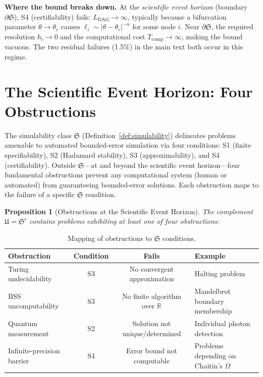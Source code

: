 \documentclass[11pt,a4paper]{article}
\newtheorem{proposition}[definition]{Proposition}
\newcommand{\R}{\mathbb{R}}
\newcommand{\Sclass}{\mathfrak{S}}
\begin{document}
\textbf{Where the bound breaks down.} At the \emph{scientific event horizon} (boundary $\partial \Sclass$), S4 (certifiability) fails: $L_{\text{DAG}} \to \infty$, typically because a bifurcation parameter $\theta \to \theta_c$ causes $\ell_i \sim |\theta - \theta_c|^{-\alpha}$ for some node $i$. Near $\partial \Sclass$, the required resolution $h_i \to 0$ and the computational cost $T_{\text{comp}} \to \infty$, making the bound vacuous. The two residual failures (1.5\%) in the main text both occur in this regime.

\section{The Scientific Event Horizon: Four Obstructions}
\label{sec:s2}

The simulability class $\Sclass$ (Definition~\ref{def:simulability}) delineates problems amenable to automated bounded-error simulation via four conditions: S1 (finite specifiability), S2 (Hadamard stability), S3 (approximability), and S4 (certifiability). Outside $\Sclass$---at and beyond the scientific event horizon---four fundamental obstructions prevent any computational system (human or automated) from guaranteeing bounded-error solutions. Each obstruction maps to the failure of a specific $\Sclass$ condition.

\begin{proposition}[Obstructions at the Scientific Event Horizon]
The complement $\mathfrak{U} = \Sclass^c$ contains problems exhibiting at least one of four obstructions:
\end{proposition}

\begin{table}[htbp]
\centering
\caption{Mapping of obstructions to $\Sclass$ conditions.}
\small
\begin{tabularx}{\textwidth}{lccX}
\toprule
\textbf{Obstruction} & \textbf{Condition} & \textbf{Fails} & \textbf{Example} \\
\midrule
Turing undecidability & S3 & No convergent approximation & Halting problem \\
BSS uncomputability & S3 & No finite algorithm over $\R$ & Mandelbrot boundary membership \\
Quantum measurement & S2 & Solution not unique/determined & Individual photon detection \\
Infinite-precision barrier & S4 & Error bound not computable & Problems depending on Chaitin's $\Omega$ \\
\bottomrule
\end{tabularx}
\end{table}
\end{document}
